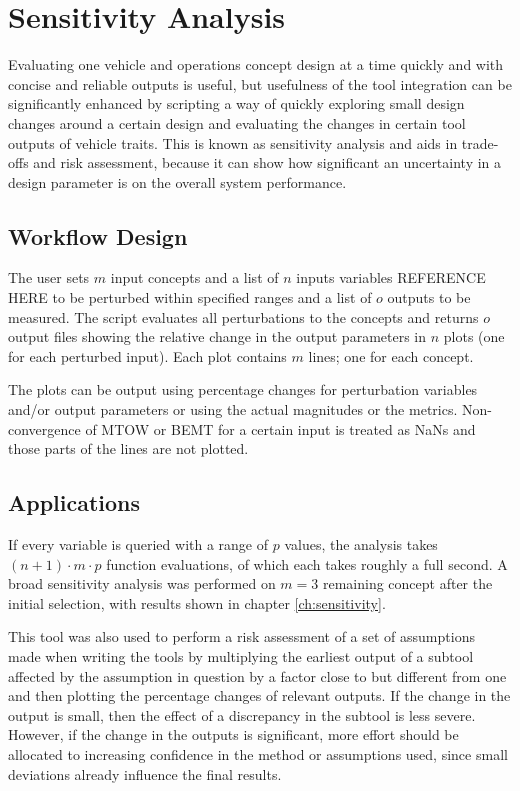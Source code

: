 





\section{Sensitivity Analysis} 
\label{sec:sensitivityanalysis}

Evaluating one vehicle and operations concept design at a time quickly and with concise and reliable outputs is useful, but usefulness of the tool integration can be significantly enhanced by scripting a way of quickly exploring small design changes around a certain design and evaluating the changes in certain tool outputs of vehicle traits. This is known as sensitivity analysis and aids in trade-offs and risk assessment, because it can show how significant an uncertainty in a design parameter is on the overall system performance.

\subsection{Workflow Design}

The user sets $m$ input concepts and a list of $n$ inputs variables REFERENCE HERE to be perturbed within specified ranges and a list of $o$ outputs to be measured. The script evaluates all perturbations to the concepts and returns $o$ output files showing the relative change in the output parameters in $n$ plots (one for each perturbed input). Each plot contains $m$ lines; one for each concept.

The plots can be output using percentage changes for perturbation variables and/or output parameters or using the actual magnitudes or the metrics. Non-convergence of MTOW or BEMT for a certain input is treated as NaNs and those parts of the lines are not plotted.


\subsection{Applications}

If every variable is queried with a range of $p$ values, the analysis takes $(n+1)\cdot m\cdot p$ function evaluations, of which each takes roughly a full second. A broad sensitivity analysis was performed on $m=3$ remaining concept after the initial selection, with results shown in chapter \ref{ch:sensitivity}.

This tool was also used to perform a risk assessment of a set of assumptions made when writing the tools by multiplying the earliest output of a subtool affected by the assumption in question by a factor close to but different from one and then plotting the percentage changes of relevant outputs. If the change in the output is small, then the effect of a discrepancy in the subtool is less severe. However, if the change in the outputs is significant, more effort should be allocated to increasing confidence in the method or assumptions used, since small deviations already influence the final results.





 